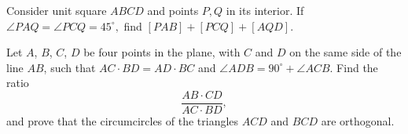 \documentclass{article}
\begin{document}
    \begin{prob}[]{13}
Consider unit square $ABCD$ and points $P,Q$ in its interior. If $\angle PAQ=\angle PCQ=45^{\circ},$ find $[PAB]+[PCQ]+[AQD].$
\end{prob}

    \begin{prob}[IMO 1993/2]{13}
Let $A$, $B$, $C$, $D$ be four points in the plane, with $C$ and $D$ on the same side of the line $AB$, such that $AC \cdot BD = AD \cdot BC$ and $\angle ADB = 90^{\circ}+\angle ACB$. Find the ratio
\[\frac{AB \cdot CD}{AC \cdot BD}, \]
and prove that the circumcircles of the triangles $ACD$ and $BCD$ are orthogonal.
\end{prob}
\end{document}

